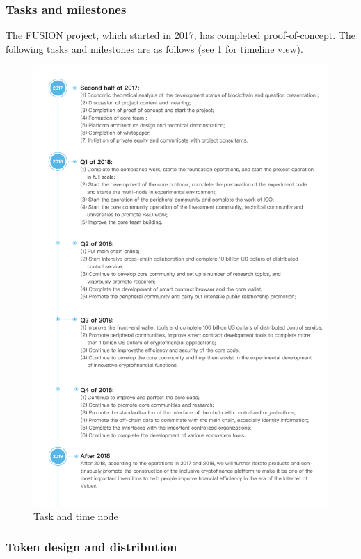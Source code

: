 \documentclass[a4paper,12pt]{article}
\begin{document}
\subsubsection{Tasks and milestones}

The FUSION project, which started in 2017, has completed proof-of-concept. The following tasks and milestones are as follows (see \ref{fig: timeline} for timeline view).

\begin{figure} [htbp]
\centering \includegraphics [width = 6.2in]{pic/timeline.png}
\caption{Task and time node} \label{fig: timeline}
\end{figure}

\subsubsection{Token design and distribution}
\end{document}
